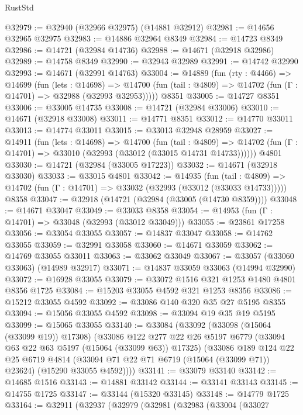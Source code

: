 \begin{lexlean}{RustStd}
\begin{coremodule}
@32979 := @32940 (@32966 @32975) (@14881 @32912)
@32981 := @14656 @32965 @32975
@32983 := @14886 @32964 @8349
@32984 := @14723 @8349
@32986 := @14721 (@32984 @14736)
@32988 := @14671 (@32918 @32986)
@32989 := @14758 @8349
@32990 := @32943 @32989
@32991 := @14742 @32990
@32993 := @14671 (@32991 @14763)
@33004 := @14889
    (fun (rty : @4466) =>
    @14699
      (fun (lets : @14698) =>
      @14700 (fun (tail : @4809) => @14702 (fun (Γ : @14701) => @32988 (@32993 @32953)))))
    @8351
@33005 := @14727 @8351
@33006 := @33005 @14735
@33008 := @14721 (@32984 @33006)
@33010 := @14671 (@32918 @33008)
@33011 := @14771 @8351
@33012 := @14770 @33011
@33013 := @14774 @33011
@33015 := @33013 @32948 @28959
@33027 := @14911
    (fun (lets : @14698) =>
    @14700
      (fun (tail : @4809) =>
      @14702 (fun (Γ : @14701) => @33010 (@32993 (@33012 (@33015 @14731 @14733))))))
    @4801
@33030 := @14721 (@32984 (@33005 @17223))
@33032 := @14671 (@32918 @33030)
@33033 := @33015 @4801
@33042 := @14935
    (fun (tail : @4809) => @14702 (fun (Γ : @14701) => @33032 (@32993 (@33012 (@33033 @14733)))))
    @8358
@33047 := @32918 (@14721 (@32984 (@33005 (@14730 @8359))))
@33048 := @14671 @33047
@33049 := @33033 @8358
@33054 := @14953 (fun (Γ : @14701) => @33048 (@32993 (@33012 @33049)))
@33055 := @23861 @17258
@33056 := @33054 @33055
@33057 := @14837 @33047
@33058 := @14762 @33055
@33059 := @32991 @33058
@33060 := @14671 @33059
@33062 := @14769 @33055 @33011
@33063 := @33062 @33049
@33067 := @33057 (@33060 @33063) (@14989 @32917)
@33071 := @14837 @33059 @33063 (@14994 @32990)
@33072 := @16928 @33055
@33079 := @33072 @1516 @321 @1253 @1480 @4801 @8356 @1725
@33084 := @15203 @33055 @4592 @321 @1253 @8356
@33086 := @15212 @33055 @4592
@33092 := @33086 @140 @320 @35 @27 @5195 @8355
@33094 := @15056 @33055 @4592
@33098 := @33094 @19 @35 @19 @5195
@33099 := @15065 @33055
@33140 := @33084
    (@33092
      (@33098 (@15064 (@33099 @19)) @17308)
      (@33086
        @122
        @277
        @22
        @26
        @5197
        @6779
        (@33094 @63 @22 @63 @5197 (@15064 (@33099 @63)) @17325)
        (@33086
          @189
          @124
          @22
          @25
          @6719
          @4814
          (@33094 @71 @22 @71 @6719 (@15064 (@33099 @71)) @23624)
          (@15290 @33055 @4592))))
@33141 := @33079 @33140
@33142 := @14685 @1516
@33143 := @14881 @33142
@33144 := @33141 @33143
@33145 := @14755 @1725
@33147 := @33144 (@15320 @33145)
@33148 := @14779 @1725
@33164 := @32911
    (@32937
      (@32979
        (@32981
          (@32983
            (@33004
              (@33027

\end{coremodule}
\end{lexlean}
